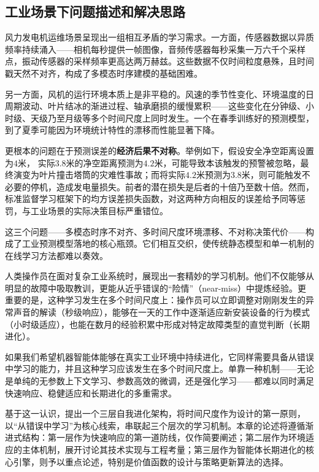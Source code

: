 \documentclass[12pt,a4paper]{article}
\begin{document}
\subsection{工业场景下问题描述和解决思路}

风力发电机运维场景呈现出一组相互矛盾的学习需求。一方面，传感器数据以异质频率持续涌入——相机每秒提供一帧图像，音频传感器每秒采集一万六千个采样点，振动传感器的采样频率更高达两万赫兹。这些数据不仅时间粒度悬殊，且时间戳天然不对齐，构成了多模态时序建模的基础困难。

另一方面，风机的运行环境本质上是非平稳的。风速的季节性变化、环境温度的日周期波动、叶片结冰的渐进过程、轴承磨损的缓慢累积——这些变化在分钟级、小时级、天级乃至月级等多个时间尺度上同时发生。一个在春季训练好的预测模型，到了夏季可能因为环境统计特性的漂移而性能显著下降。

更根本的问题在于预测误差的\textbf{经济后果不对称}。举例如下，假设安全净空距离设置为$4$米， 实际$3.8$米的净空距离预测为$4.2$米，可能导致本该触发的预警被忽略，最终演变为叶片撞击塔筒的灾难性事故；而将实际$4.2$米预测为$3.8$米，则可能触发不必要的停机，造成发电量损失。前者的潜在损失是后者的十倍乃至数十倍。然而，标准监督学习框架下的均方误差损失函数，对这两种方向相反的误差给予同等惩罚，与工业场景的实际决策目标严重错位。

这三个问题——多模态时序不对齐、多时间尺度环境漂移、不对称决策代价——构成了工业预测模型落地的核心瓶颈。它们相互交织，使传统静态模型和单一机制的在线学习方法都难以奏效。

人类操作员在面对复杂工业系统时，展现出一套精妙的学习机制。他们不仅能够从明显的故障中吸取教训，更能从近乎错误的“险情”（near-miss）中提炼经验。更重要的是，这种学习发生在多个时间尺度上：操作员可以立即调整对刚刚发生的异常声音的解读（秒级响应），能够在一天的工作中逐渐适应新安装设备的行为模式（小时级适应），也能在数月的经验积累中形成对特定故障类型的直觉判断（长期进化）。

如果我们希望机器智能体能够在真实工业环境中持续进化，它同样需要具备从错误中学习的能力，并且这种学习应该发生在多个时间尺度上。单靠一种机制——无论是单纯的无参数上下文学习、参数高效的微调，还是强化学习——都难以同时满足快速响应、稳健适应和长期进化的多重需求。

基于这一认识，提出一个三层自我进化架构，将时间尺度作为设计的第一原则，以“从错误中学习”为核心线索，串联起三个层次的学习机制。本章的论述将遵循渐进式结构：第一层作为快速响应的第一道防线，仅作简要阐述；第二层作为环境适应的主体机制，展开讨论其技术实现与工程考量；第三层作为智能体长期进化的核心引擎，则予以重点论述，特别是价值函数的设计与策略更新算法的选择。
\end{document}
